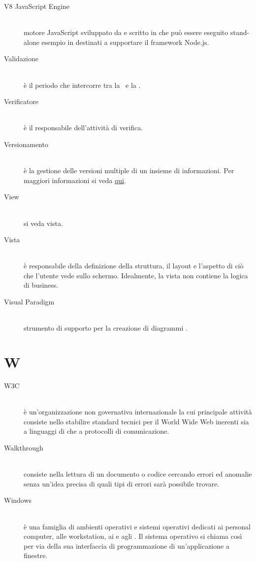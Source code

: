 \documentclass[12pt,a4paper]{article}
\begin{document}
\begin{description}
\item[V8 JavaScript Engine] 
\hfill\\motore JavaScript  sviluppato da  e scritto in  che  può essere eseguito stand-alone esempio in  destinati a supportare il framework Node.js.

\item[Validazione] 
\hfill\\è il periodo che intercorre tra la \RQ\ e la \RA.

\item[Verificatore] 
\hfill\\è il responsabile dell'attività di verifica.

\item[Versionamento] 
\hfill\\è la gestione delle versioni multiple di un insieme di informazioni. Per maggiori informazioni si veda \href{http://it. wikipedia.org/wiki/Controllo_versione}{qui}.

\item[View] 
\hfill\\si veda vista.

\item[Vista] 
\hfill\\è responsabile della definizione della struttura, il layout e l'aspetto di ciò che l'utente vede sullo schermo. Idealmente, la vista non contiene la logica di business.

\item[Visual Paradigm] 
\hfill\\strumento di supporto per la creazione di diagrammi .
\end{description}

\newpage

\section{W}

\begin{description}
\item[W3C] 
\hfill\\è un'organizzazione non governativa internazionale la cui principale attività  consiste nello stabilire standard tecnici per il World Wide Web inerenti sia a linguaggi di  che a protocolli di comunicazione.

\item[Walkthrough] 
\hfill\\consiste nella lettura di un documento o codice cercando errori ed anomalie senza un'idea precisa di quali tipi di errori sarà possibile trovare.

\item[Windows] 
\hfill\\è una famiglia di ambienti operativi e sistemi operativi dedicati ai personal computer, alle workstation, ai  e agli . Il sistema operativo si chiama così per via della sua interfaccia di programmazione di un'applicazione a finestre.
\end{description}
\end{document}
